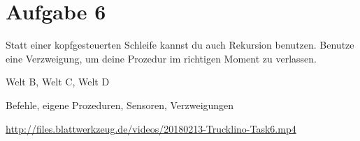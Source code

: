 \pagebreak

\section*{Aufgabe 6}
\label{sec:exercises:6}

Statt einer kopfgesteuerten Schleife kannst du auch Rekursion benutzen. Benutze eine Verzweigung, um deine Prozedur im richtigen Moment zu verlassen.

\begin{description}[noitemsep]
  \item[Welt wählen:] Welt B, Welt C, Welt D
  \item[Du brauchst:] Befehle, eigene Prozeduren, Sensoren, Verzweigungen
  \item[Video:] \url{http://files.blattwerkzeug.de/videos/20180213-Trucklino-Task6.mp4}
\end{description}

